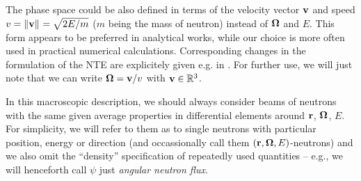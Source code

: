 \begin{remark}
	The phase space could be also defined in terms of the velocity vector $\bv$ and speed $v = \norm{\bv} = \sqrt{2E/m}$
	($m$ being the mass of neutron) instead of $\bomega$ and $E$. 
	This form appears to be preferred in analytical works, while our choice is more often used in practical numerical
	calculations.
	Corresponding changes in the formulation of the NTE are
	explicitely given e.g. in \cite[Chap. XXI, eqns. (1.1) and (1.2)]{DautrayLions}. For further use, we will just note
	that we can write $\bomega = \bv / v$ with $\bv\in\R[3]$.
\end{remark} 
\begin{remark}
	In this macroscopic description, we should always consider beams of neutrons with the same given average properties in
	differential elements around $\br$, $\bomega$, $E$. For simplicity, we will refer to them as to single neutrons with
	particular position, energy or direction (and occassionally call them $(\br,\bomega,E)$-neutrons) and we also omit the
	``density'' specification of repeatedly used quantities -- e.g., we will henceforth call $\psi$ just \textit{angular neutron flux}.
\end{remark} 


